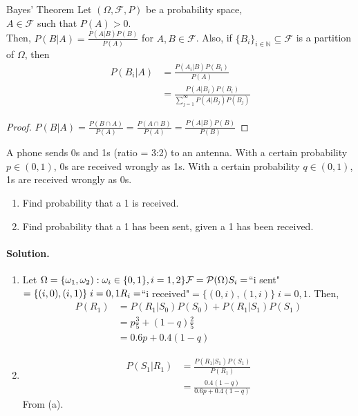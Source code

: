 \documentclass{article}
\begin{document}
	\begin{mythm}{Bayes' Theorem}{}
		Let $(\Omega, \mathcal{F}, P)$ be a probability space,\\
		$A\in\mathcal{F}$ such that $P(A)>0$.\\
		Then, $P(B|A)=\frac{P(A|B)P(B)}{P(A)}$ for $A, B\in\mathcal{F}$. Also, if $\{B_i\}_{i\in\mathbb{N}}\subseteq\mathcal{F}$ is a partition of $\Omega$, then
		\begin{align*}
			P(B_i|A)&=\frac{P(A_i|B)P(B_i)}{P(A)}\\
			&=\frac{P(A|B_i)P(B_i)}{\sum_{j=1}^{\infty}P(A|B_j)P(B_j)}
		\end{align*}
		\begin{proof}
			$P(B|A)=\frac{P(B\cap A)}{P(A)}=\frac{P(A\cap B)}{P(A)}=\frac{P(A|B)P(B)}{P(B)}$
		\end{proof}
	\end{mythm}
	
	\begin{myex}{}{}
		A phone sends 0s and 1s (ratio = 3:2) to an antenna. With a certain probability $p\in(0, 1)$, 0s are received wrongly as 1s. With a certain probability $q\in(0, 1)$, 1s are received wrongly as 0s.
		\begin{enumerate}[label=(\alph*)]
			\item Find probability that a 1 is received.
			\item Find probability that a 1 has been sent, given a 1 has been received.
		\end{enumerate}
		\paragraph{Solution.}
		\begin{enumerate}[label=(\alph*)]
			\item Let $\Omega=\{\omega_1, \omega_2) : \omega_i\in\{0, 1\}, i=1, 2\}\\
			\mathcal{F}=\mathcal{P}(\Omega)\\
			S_i=$``i sent"$=\{(i, 0), (i, 1)\}\;i=0, 1\\
			R_i=$``i received"$=\{(0, i), (1, i)\}\;i=0, 1$. Then,
			\begin{align*}
				P(R_1)&=P(R_1|S_0)P(S_0)+P(R_1|S_1)P(S_1)\\
				&=p\frac{3}{5}+(1-q)\frac{2}{5}\\
				&=0.6p+0.4(1-q)
			\end{align*}
			\item
			\begin{align*}
				P(S_1|R_1)&=\frac{P(R_1|S_1)P(S_1)}{P(R_1)}\\
				&=\frac{0.4(1-q)}{0.6p+0.4(1-q)}
			\end{align*}
			From (a).
		\end{enumerate}
	\end{myex}
	
\end{document}
